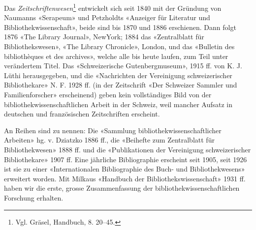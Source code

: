 \documentclass[a4paper,
fontsize=11pt,
oneside,
numbers=noperiodatend,
parskip=half-,
bibliography=totoc,
final
]{scrartcl}
\begin{document}
Das \emph{Zeitschriftenwesen}\footnote{Vgl. Gräsel, Handbuch, 8. 20--45.}
entwickelt sich seit 1840 mit der Gründung von Naumanns «Serapeum» und
Petzholdts «Anzeiger für Literatur und Bibliothekwissenschaft», beide
sind bis 1870 und 1886 erschienen. Dann folgt 1876 «The Library
Journal», NewYork; 1884 das «Zentralblatt für Bibliothekswesen», «The
Library Chronicle», London, und das «Bulletin des bibliothèques et des
archives», welche alle bis heute laufen, zum Teil unter verändertem
Titel. Das «Schweizerische Gutenbergmuseum», 1915 ff. von K. J. Lüthi
herausgegeben, und die «Nachrichten der Vereinigung schweizerischer
Bibliothekare» N. F. 1928 ff. (in der Zeitschrift «Der Schweizer Sammler
und Familienforscher» erscheinend) geben kein vollständiges Bild von der
bibliothekwissenschaftlichen Arbeit in der Schweiz, weil mancher Aufsatz
in deutschen und französischen Zeitschriften erscheint.

An Reihen sind zu nennen: Die «Sammlung bibliothekwissenschaftlicher
Arbeiten» hg. v. Dziatzko 1886 ff., die «Beihefte zum Zentralblatt für
Bibliothekwesen» 1888 ff. und die «Publikationen der Vereinigung
schweizerischer Bibliothekare» 1907 ff. Eine jährliche Bibliographie
erscheint seit 1905, seit 1926 ist sie zu einer «Internationalen
Bibliographie des Buch- und Bibliothekwesens» erweitert worden. Mit
Milkaus «Handbuch der Bibliothekswissenschaft» 1931 ff. haben wir die
erste, grosse Zusammenfassung der bibliothekwissenschaftlichen Forschung
erhalten.
\end{document}

